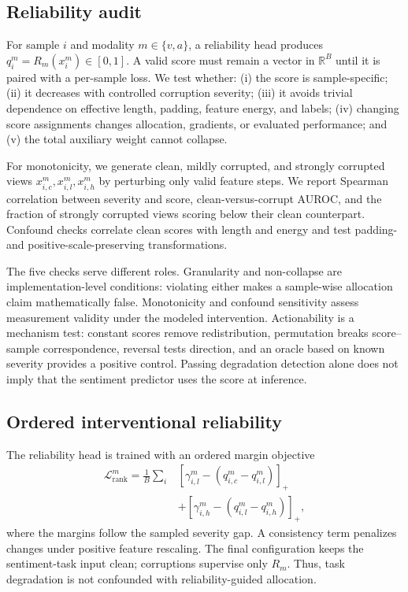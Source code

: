 \documentclass{article}
\begin{document}
\subsection{Reliability audit}

For sample $i$ and modality $m\in\{v,a\}$, a reliability head produces $q_i^m=R_m(x_i^m)\in[0,1]$. A valid score must remain a vector in $\mathbb{R}^{B}$ until it is paired with a per-sample loss. We test whether: (i) the score is sample-specific; (ii) it decreases with controlled corruption severity; (iii) it avoids trivial dependence on effective length, padding, feature energy, and labels; (iv) changing score assignments changes allocation, gradients, or evaluated performance; and (v) the total auxiliary weight cannot collapse.

For monotonicity, we generate clean, mildly corrupted, and strongly corrupted views $x_{i,c}^m,x_{i,l}^m,x_{i,h}^m$ by perturbing only valid feature steps. We report Spearman correlation between severity and score, clean-versus-corrupt AUROC, and the fraction of strongly corrupted views scoring below their clean counterpart. Confound checks correlate clean scores with length and energy and test padding- and positive-scale-preserving transformations.

The five checks serve different roles. Granularity and non-collapse are implementation-level conditions: violating either makes a sample-wise allocation claim mathematically false. Monotonicity and confound sensitivity assess measurement validity under the modeled intervention. Actionability is a mechanism test: constant scores remove redistribution, permutation breaks score--sample correspondence, reversal tests direction, and an oracle based on known severity provides a positive control. Passing degradation detection alone does not imply that the sentiment predictor uses the score at inference.

\subsection{Ordered interventional reliability}

The reliability head is trained with an ordered margin objective
\begin{align}
\mathcal{L}_{\mathrm{rank}}^m=\frac{1}{B}\sum_i &\left[\gamma_{i,l}^m-(q_{i,c}^m-q_{i,l}^m)\right]_+ \nonumber\\
&+\left[\gamma_{i,h}^m-(q_{i,l}^m-q_{i,h}^m)\right]_+ ,
\label{eq:rank}
\end{align}
where the margins follow the sampled severity gap. A consistency term penalizes changes under positive feature rescaling. The final configuration keeps the sentiment-task input clean; corruptions supervise only $R_m$. Thus, task degradation is not confounded with reliability-guided allocation.
\end{document}
